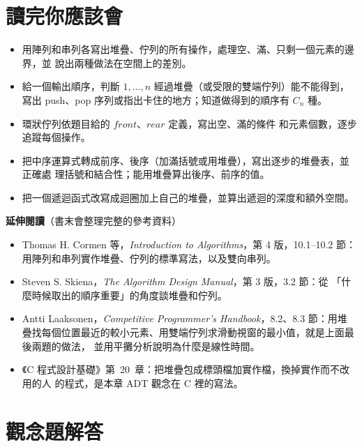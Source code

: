\section{讀完你應該會}
\label{sec:sq-checklist}

\begin{itemize}
\item 用陣列和串列各寫出堆疊、佇列的所有操作，處理空、滿、只剩一個元素的邊界，並
說出兩種做法在空間上的差別。
\item 給一個輸出順序，判斷 $1, \ldots, n$ 經過堆疊（或受限的雙端佇列）能不能得到，
寫出 push、pop 序列或指出卡住的地方；知道做得到的順序有 $C_n$ 種。
\item 環狀佇列依題目給的 $\mathit{front}$、$\mathit{rear}$ 定義，寫出空、滿的條件
和元素個數，逐步追蹤每個操作。
\item 把中序運算式轉成前序、後序（加滿括號或用堆疊），寫出逐步的堆疊表，並正確處
理括號和結合性；能用堆疊算出後序、前序的值。
\item 把一個遞迴函式改寫成迴圈加上自己的堆疊，並算出遞迴的深度和額外空間。
\end{itemize}

\textbf{延伸閱讀}（書末會整理完整的參考資料）

\begin{itemize}
\item Thomas H. Cormen 等，\textit{Introduction to Algorithms}，第 4 版，10.1--10.2
節：用陣列和串列實作堆疊、佇列的標準寫法，以及雙向串列。
\item Steven S. Skiena，\textit{The Algorithm Design Manual}，第 3 版，3.2 節：從
「什麼時候取出的順序重要」的角度談堆疊和佇列。
\item Antti Laaksonen，\textit{Competitive Programmer's Handbook}，8.2、8.3 節：用堆
疊找每個位置最近的較小元素、用雙端佇列求滑動視窗的最小值，就是上面最後兩題的做法，
並用平攤分析說明為什麼是線性時間。
\item 《C 程式設計基礎》第~20~章：把堆疊包成標頭檔加實作檔，換掉實作而不改用的人
的程式，是本章 ADT 觀念在 C 裡的寫法。
\end{itemize}

\section*{觀念題解答}

